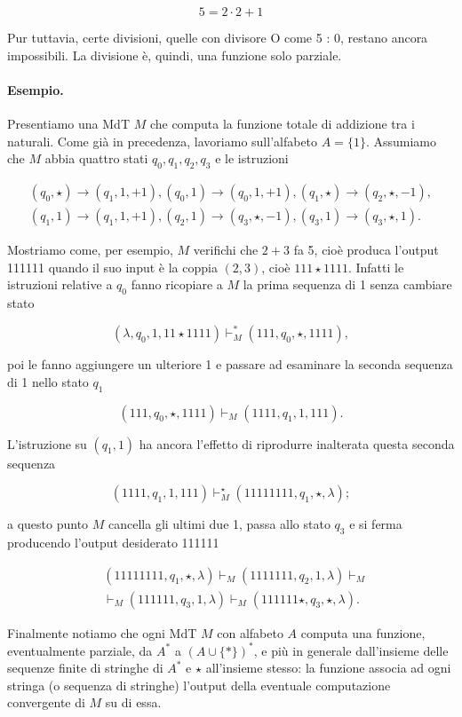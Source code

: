 \[
    5 = 2 \cdot 2 + 1
\]

Pur tuttavia, certe divisioni, quelle con divisore O come 5 : 0, restano ancora
impossibili. La divisione è, quindi, una funzione solo parziale.

\paragraph{Esempio.}
Presentiamo una MdT $M$ che computa la funzione totale di addizione tra i naturali.
Come già in precedenza, lavoriamo sull'alfabeto $A = \{1\}$. Assumiamo che $M$
abbia quattro stati $q_0, q_1, q_2, q_3$ e le istruzioni

$$
    \begin{gathered}
        \left(q_0, \star\right) \rightarrow\left(q_1, 1,+1\right),\left(q_0, 1\right) \rightarrow\left(q_0, 1,+1\right),\left(q_1, \star\right) \rightarrow\left(q_2, \star,-1\right), \\
        \left(q_1, 1\right) \rightarrow\left(q_1, 1,+1\right),\left(q_2, 1\right) \rightarrow\left(q_3, \star,-1\right),\left(q_3, 1\right) \rightarrow\left(q_3, \star, 1\right) .
    \end{gathered}
$$

Mostriamo come, per esempio, $M$ verifichi che $2+3$ fa 5, cioè produca l'output
111111 quando il suo input è la coppia $(2,3)$, cioè $111 \star 1111$.
Infatti le istruzioni relative a $q_0$ fanno ricopiare a $M$ la prima sequenza di
1 senza cambiare stato

$$
    \left(\lambda, q_0, 1,11 \star 1111\right) \vdash_M^*\left(111, q_0, \star, 1111\right),
$$

poi le fanno aggiungere un ulteriore 1 e passare ad esaminare la seconda sequenza
di 1 nello stato $q_1$

$$
    \left(111, q_0, \star, 1111\right) \vdash_M\left(1111, q_1, 1,111\right) .
$$

L'istruzione su $\left(q_1, 1\right)$ ha ancora l'effetto di riprodurre inalterata
questa seconda sequenza

$$
    \left(1111, q_1, 1,111\right) \vdash_M^{\star}\left(11111111, q_1, \star, \lambda\right) ;
$$

a questo punto $M$ cancella gli ultimi due 1, passa allo stato $q_3$ e si ferma
producendo l'output desiderato 111111

$$
    \begin{aligned}
         & \left(11111111, q_1, \star, \lambda\right) \vdash_M\left(1111111, q_2, 1, \lambda\right) \vdash_M     \\
         & \vdash_M\left(111111, q_3, 1, \lambda\right) \vdash_M\left(111111 \star, q_3, \star, \lambda\right) .
    \end{aligned}
$$

Finalmente notiamo che ogni MdT $M$ con alfabeto $A$ computa una funzione,
eventualmente parziale, da $A^*$ a $(A \cup\{*\})^*$, e più in generale
dall'insieme delle sequenze finite di stringhe di $A^*$ e $\star$ all'insieme
stesso: la funzione associa ad ogni stringa (o sequenza di stringhe) l'output della
eventuale computazione convergente di $M$ su di essa.